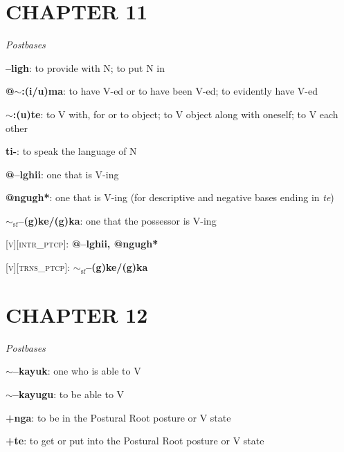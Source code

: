 \documentclass{article}
\begin{document}
\section*{CHAPTER 11}

\textit{Postbases}
\begin{description}
\item \textbf{--ligh}: to provide with N; to put N in
\item \textbf{@$\sim$:(i/u)ma}: to have V-ed or to have been V-ed; to evidently have V-ed
\item \textbf{$\sim$:(u)te}: to V with, for or to object; to V object along with oneself; to V each other
\item \textbf{ti-}: to speak the language of N
\item \textbf{@--lghii}: one that is V-ing
\item \textbf{@ngugh*}: one that is V-ing (for descriptive and negative bases ending in \textit{te})
\item \textbf{$\sim_\text{sf}$--(g)ke/(g)ka}: one that the possessor is V-ing
\end{description}

\bigskip

\textsc{[v][intr\_ptcp]}: \textbf{@--lghii, @ngugh*}

\textsc{[v][trns\_ptcp]}: \textbf{$\sim_\text{sf}$--(g)ke/(g)ka}

\section*{CHAPTER 12}

\textit{Postbases}
\begin{description}
\item \textbf{$\sim$--kayuk}: one who is able to V
\item \textbf{$\sim$--kayugu}: to be able to V
\item \textbf{+nga}: to be in the Postural Root posture or V state
\item \textbf{+te}: to get or put into the Postural Root posture or V state
\end{description}
\end{document}
